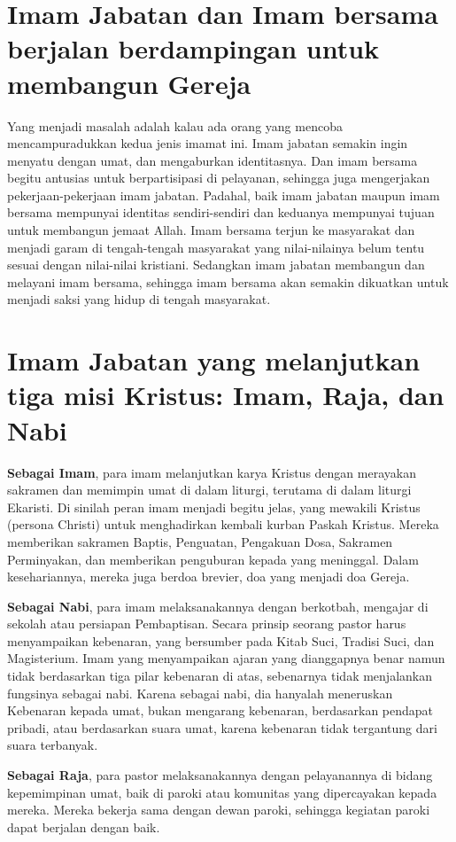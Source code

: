 \section*{Imam Jabatan dan Imam bersama berjalan berdampingan untuk membangun Gereja}

Yang menjadi masalah adalah kalau ada orang yang mencoba mencampuradukkan kedua jenis imamat ini. Imam jabatan semakin ingin menyatu dengan umat, dan mengaburkan identitasnya. Dan imam bersama begitu antusias untuk berpartisipasi di pelayanan, sehingga juga mengerjakan pekerjaan-pekerjaan imam jabatan. Padahal, baik imam jabatan maupun imam bersama mempunyai identitas sendiri-sendiri dan keduanya mempunyai tujuan untuk membangun jemaat Allah. Imam bersama terjun ke masyarakat dan menjadi garam di tengah-tengah masyarakat yang nilai-nilainya belum tentu sesuai dengan nilai-nilai kristiani. Sedangkan imam jabatan membangun dan melayani imam bersama, sehingga imam bersama akan semakin dikuatkan untuk menjadi saksi yang hidup di tengah masyarakat.

\section*{Imam Jabatan yang melanjutkan tiga misi Kristus: Imam, Raja, dan Nabi}

\textbf{Sebagai Imam}, para imam melanjutkan karya Kristus dengan merayakan sakramen dan memimpin umat di dalam liturgi, terutama di dalam liturgi Ekaristi. Di sinilah peran imam menjadi begitu jelas, yang mewakili Kristus (persona Christi) untuk menghadirkan kembali kurban Paskah Kristus. Mereka memberikan sakramen Baptis, Penguatan, Pengakuan Dosa, Sakramen Perminyakan, dan memberikan penguburan kepada yang meninggal. Dalam kesehariannya, mereka juga berdoa brevier, doa yang menjadi doa Gereja.

\textbf{Sebagai Nabi}, para imam melaksanakannya dengan berkotbah, mengajar di sekolah atau persiapan Pembaptisan. Secara prinsip seorang pastor harus menyampaikan kebenaran, yang bersumber pada Kitab Suci, Tradisi Suci, dan Magisterium. Imam yang menyampaikan ajaran yang dianggapnya benar namun tidak berdasarkan tiga pilar kebenaran di atas, sebenarnya tidak menjalankan fungsinya sebagai nabi. Karena sebagai nabi, dia hanyalah meneruskan Kebenaran kepada umat, bukan mengarang kebenaran, berdasarkan pendapat pribadi, atau berdasarkan suara umat, karena kebenaran tidak tergantung dari suara terbanyak.

\textbf{Sebagai Raja}, para pastor melaksanakannya dengan pelayanannya di bidang kepemimpinan umat, baik di paroki atau komunitas yang dipercayakan kepada mereka. Mereka bekerja sama dengan dewan paroki, sehingga kegiatan paroki dapat berjalan dengan baik.

